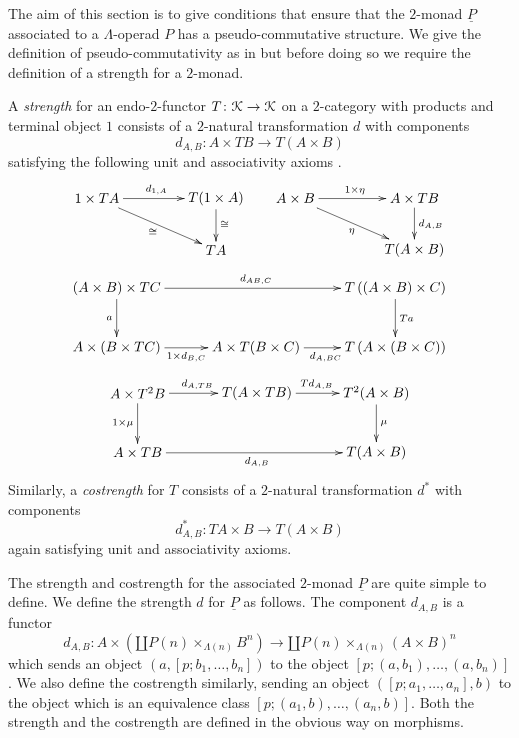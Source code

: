 The aim of this section is to give conditions that ensure that the $2$-monad $\underline{P}$ associated to a $\Lambda$-operad $P$ has a pseudo-commutative structure. We give the definition of pseudo-commutativity as in \cite{HP} but before doing so we require the definition of a strength for a $2$-monad.
\begin{Defi}
A \textit{strength} for an endo-$2$-functor $T \colon \mathcal{K} \rightarrow \mathcal{K}$ on a $2$-category with products and terminal object $1$ consists of a $2$-natural transformation $d$ with components
    \[
        d_{A,B} \colon A \times TB \rightarrow T(A \times B)
    \]
satisfying the following unit and associativity axioms \cite{kock-monads}.
  \[
    \xy
    (0,0)*+{1 \times TA}="ul1";
    (30,0)*+{T(1 \times A)}="ur1";
    (30,-13)*+{TA}="br1";
    (50,0)*+{A \times B}="ul2";
    (80,0)*+{A \times TB}="ur2";
    (80,-13)*+{T(A \times B)}="br2";
    {\ar^{d_{1,A}} "ul1"; "ur1"};
    {\ar^{\cong} "ur1"; "br1"};
    {\ar_{\cong} "ul1"; "br1"};
    {\ar^{1 \times \eta} "ul2"; "ur2"};
    {\ar^{d_{A,B}} "ur2"; "br2"};
    {\ar_{\eta} "ul2"; "br2"};
    \endxy
  \]
  \[
    \xy
    (0,0)*+{(A \times B) \times TC}="ul";
    (70,0)*+{T \left((A \times B) \times C \right)}="ur";
    (0,-15)*+{A \times (B \times TC)}="ll";
    (35,-15)*+{A \times T(B \times C)}="m";
    (70,-15)*+{ T \left(A \times (B \times C) \right)}="lr";
    {\ar^{d_{AB,C}} "ul"; "ur"};
    {\ar^{Ta} "ur"; "lr"};
    {\ar_{a} "ul"; "ll"};
    {\ar_{1 \times d_{B,C}} "ll"; "m"};
    {\ar_{d_{A,BC}} "m"; "lr"};
    \endxy
  \]
  \[
    \xy
    (0,0)*+{A \times T^{2}B}="ul";
    (60,0)*+{T^{2}(A \times B)}="ur";
    (0,-15)*+{A \times TB}="ll";
    (30,0)*+{T(A \times TB)}="m";
    (60,-15)*+{ T(A \times B)}="lr";
    {\ar^{d_{A,TB}} "ul"; "m"};
    {\ar^{Td_{A,B}} "m"; "ur"};
    {\ar^{\mu} "ur"; "lr"};
    {\ar_{1 \times \mu} "ul"; "ll"};
    {\ar_{d_{A,B}} "ll"; "lr"};
    \endxy
  \]
Similarly, a \emph{costrength} for $T$ consists of a $2$-natural transformation $d^{\ast}$ with components
  \[
      d^{\ast}_{A,B} \colon TA \times B \rightarrow T(A \times B)
  \]
again satisfying unit and associativity axioms.
\end{Defi}
The strength and costrength for the associated $2$-monad $\underline{P}$ are quite simple to define. We define the strength $d$ for $\underline{P}$ as follows. The component $d_{A,B}$ is a functor
    \[
        d_{A,B} \colon A \times \left(\amalg P(n) \times_{\Lambda(n)} B^n\right) \rightarrow \amalg P(n) \times_{\Lambda(n)} \left(A \times B \right)^n
    \]
which sends an object $(a, [p;b_1,\ldots,b_n])$ to the object $[p;(a,b_1),\ldots,(a,b_n)]$. We also define the costrength similarly, sending an object $([p;a_1,\ldots,a_n],b)$ to the object which is an equivalence class $[p;(a_1,b), \ldots, (a_n, b)]$. Both the strength and the costrength are defined in the obvious way on morphisms.

